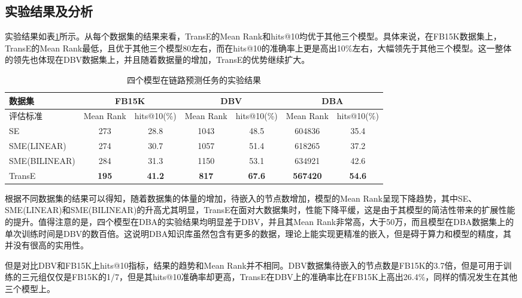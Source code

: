 \subsection{实验结果及分析}
实验结果如表\ref{results}所示。从每个数据集的结果来看，TransE的Mean Rank和hits@10均优于其他三个模型。具体来说，在FB15K数据集上，TransE的Mean Rank最低，且优于其他三个模型80左右，而在hits@10的准确率上更是高出10\%左右，大幅领先于其他三个模型。这一整体的领先也体现在DBV数据集上，并且随着数据量的增加，TransE的优势继续扩大。
\begin{table}[H]
\centering
\caption{四个模型在链路预测任务的实验结果}
\begin{adjustbox}{max width=\textwidth}
\begin{tabular}{lcccccc}
\toprule
数据集 & \multicolumn{2}{c}{FB15K} & \multicolumn{2}{c}{DBV} & \multicolumn{2}{c}{DBA} \\
\midrule
评估标准 & Mean Rank & hits@10(\%) & Mean Rank & hits@10(\%) & Mean Rank & hits@10(\%) \\
\midrule
SE & 273 & 28.8 & 1043 & 48.5 &  604836 & 35.4\\
SME(LINEAR) & 274 & 30.7 &  1057 & 51.4 & 618265 & 37.2 \\
SME(BILINEAR) & 284 & 31.3 &  1150 & 53.1 & 634921 & 42.6 \\
\midrule
TransE & \textbf{195} & \textbf{41.2} &  \textbf{817} & \textbf{67.6} & \textbf{567420} & \textbf{54.6} \\
\bottomrule
\end{tabular}
\end{adjustbox}
\label{results}
\end{table}
根据不同数据集的结果可以得知，随着数据集的体量的增加，待嵌入的节点数增加，模型的Mean Rank呈现下降趋势，其中SE、SME(LINEAR)和SME(BILINEAR)的升高尤其明显，TransE在面对大数据集时，性能下降平缓，这是由于其模型的简洁性带来的扩展性能的提升。值得注意的是，四个模型在DBA的实验结果均明显差于DBV，并且其Mean Rank非常高，大于50万，而且模型在DBA数据集上的单次训练时间是DBV的数百倍。这说明DBA知识库虽然包含有更多的数据，理论上能实现更精准的嵌入，但是碍于算力和模型的精度，其并没有很高的实用性。

但是对比DBV和FB15K上hits@10指标，结果的趋势和Mean Rank并不相同。DBV数据集待嵌入的节点数是FB15K的3.7倍，但是可用于训练的三元组仅仅是FB15K的1/7，但是其hits@10准确率却更高，TransE在DBV上的准确率比在FB15K上高出26.4\%，同样的情况发生在其他三个模型上。

